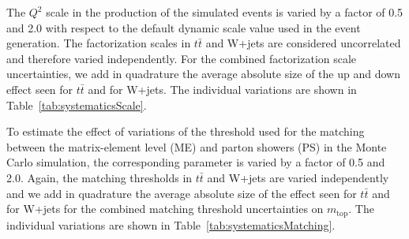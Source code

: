 \begin{description}[wide=\parindent]

\item [Factorisation scale.]
The $Q^2$ scale in the production of the simulated events is varied by a factor of 0.5 and 2.0 with respect to the
default dynamic scale value used in the event generation. The factorization scales in $t \bar t$ and W+jets are
considered uncorrelated and therefore varied independently. For the combined factorization scale uncertainties, we add
in quadrature the average absolute size of the up and down effect seen for $t \bar t$ and for W+jets. The individual
variations are shown in Table~\ref{tab:systematicsScale}.

  
\item [ME-PS matching threshold.]
To estimate the effect of variations of the threshold used for the matching between the matrix-element level (ME) and
parton showers (PS) in the Monte Carlo simulation, the corresponding parameter is varied by a factor of 0.5 and 2.0.
Again, the matching thresholds in $t \bar t$ and W+jets are varied independently and we add in quadrature the average
absolute size of the effect seen for $t \bar t$ and for W+jets for the combined matching threshold uncertainties on
$m_{\textrm{top}}$. The individual variations are shown in Table~\ref{tab:systematicsMatching}.


\end{description}
